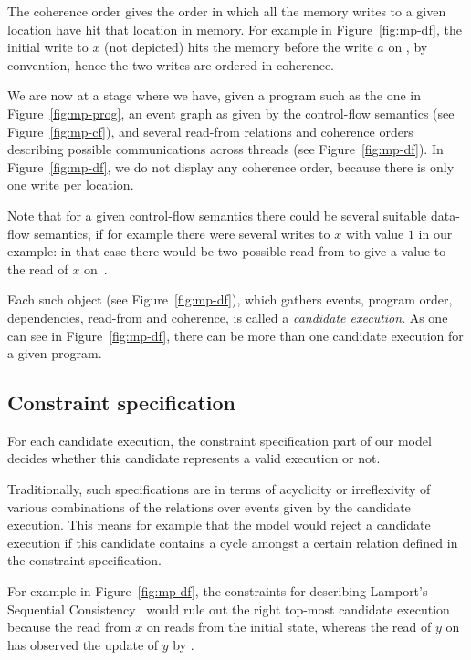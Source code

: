 The coherence order gives the order in which all the memory writes to a given
location have hit that location in memory. For example in
Figure~\ref{fig:mp-df}, the initial write to $x$ (not depicted) hits the memory
before the write $a$ on , by convention, hence the two writes are
ordered in coherence.

We are now at a stage where we have, given a program such as the one in
Figure~\ref{fig:mp-prog}, an event graph as given by the control-flow semantics
(see Figure~\ref{fig:mp-cf}), and several read-from relations and coherence
orders describing possible communications across threads (see
Figure~\ref{fig:mp-df}). In Figure~\ref{fig:mp-df}, we do not display any
coherence order, because there is only one write per location.

Note that for a given control-flow semantics there could be several suitable
data-flow semantics, if for example there were several writes to $x$ with value
$1$ in our example: in that case there would be two possible read-from to give
a value to the read of $x$ on~.

Each such object (see Figure~\ref{fig:mp-df}), which gathers events, program
order, dependencies, read-from and coherence, is called a \emph{candidate
execution}.  As one can see in Figure~\ref{fig:mp-df}, there can be more than
one candidate execution for a given program.

\subsection{Constraint specification} For each candidate execution, the
constraint specification part of our model decides whether this candidate
represents a valid execution or not.

Traditionally, such specifications are in terms of acyclicity or irreflexivity
of various combinations of the relations over events given by the candidate
execution. This means for example that the model would reject a candidate
execution if this candidate contains a cycle amongst a certain relation defined
in the constraint specification.

For example in Figure~\ref{fig:mp-df}, the constraints for describing Lamport's
Sequential Consistency~\cite{lam79} would rule out the right top-most candidate
execution because the read from $x$ on  reads from the initial state,
whereas the read of $y$ on  has observed the update of $y$ by .
